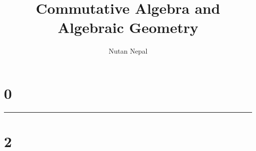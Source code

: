
\title{Commutative Algebra and Algebraic Geometry}
\author{Nutan Nepal}



\maketitle
\section*{0}

\hrule
\section*{2}
